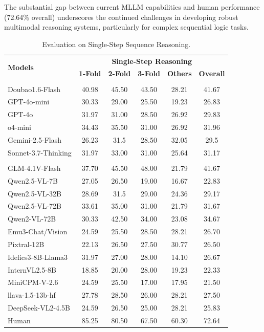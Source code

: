 \documentclass[letterpaper]{article} %
\begin{document}
The substantial gap between current MLLM capabilities and human performance (72.64\% overall) underscores the continued challenges in developing robust multimodal reasoning systems, particularly for complex sequential logic tasks.
\begin{table}[b]
\setlength{\tabcolsep}{1mm} 
\centering
\begin{tabular}{l|ccccc}
\toprule
\multirow{2}{*}{\textbf{Models}} & \multicolumn{5}{c}{\textbf{Single-Step Reasoning}} \\
 & \textbf{1-Fold} & \textbf{2-Fold} & \textbf{3-Fold} & \textbf{Others} & \textbf{Overall} \\
\midrule
\rowcolor{yellow!20}\multicolumn{6}{l}{\textbf{\textit{Proprietary}}} \\
Doubao1.6-Flash &\cellcolor{gray!30}40.98 &45.50 &43.50 &28.21 &\cellcolor{gray!30}41.67 \\
GPT-4o-mini &30.33 & 29.00& 25.50&19.23 &26.83 \\
GPT-4o & 31.97&31.00 &28.50 & 26.92&29.83 \\
o4-mini & 34.43&35.50 &31.00 & 26.92&31.96 \\
Gemini-2.5-Flash &26.23 &31.5 & 28.50&\cellcolor{gray!30}32.05 &29.5 \\
Sonnet-3.7-Thinking &31.97 &33.00 &31.00 & 25.64& 31.17\\
\midrule
\rowcolor{yellow!20}\multicolumn{6}{l}{\textbf{\textit{Open-source}}} \\
GLM-4.1V-Flash & 37.70& \cellcolor{gray!30}45.50&\cellcolor{gray!30}48.00 & 21.79&\cellcolor{gray!30}41.67 \\
Qwen2.5-VL-7B &27.05 &26.50 & 19.00&16.67& 22.83\\
Qwen2.5-VL-32B &28.69&31.5&29.00&24.36&29.17\\
Qwen2.5-VL-72B &33.61 &35.00 &31.00 &21.79 & 31.67\\
Qwen2-VL-72B &30.33 &42.50 & 34.00&23.08 &34.67 \\
Emu3-Chat/Vision &24.59&25.50&28.50&28.21&26.70\\
Pixtral-12B &22.13 & 26.50& 27.50& 30.77& 26.50\\
Idefics3-8B-Llama3 &31.97 &27.00 &28.00 & 14.10&26.67\\
InternVL2.5-8B & 18.85& 20.00& 28.00&19.23 &22.33\\
MiniCPM-V-2.6 & 24.59& 25.50&17.00 & 17.95& 21.50\\
llava-1.5-13b-hf &27.78&28.50&26.00&28.21&27.50\\
DeepSeek-VL2-4.5B &24.59&26.50&25.00&28.21&25.83\\
\midrule
Human&85.25&80.50&67.50&60.30&72.64\\
\bottomrule
\end{tabular}
\caption{Evaluation on Single-Step Sequence Reasoning.}
\label{tab:single_step_reasoning}
\end{table}
\end{document}
